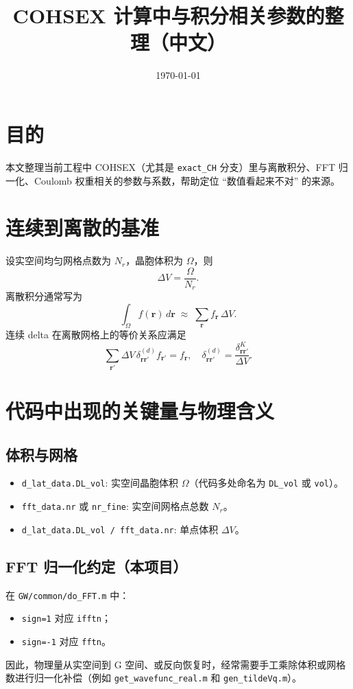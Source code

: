 \documentclass[11pt]{article}
\title{COHSEX 计算中与积分相关参数的整理（中文）}
\author{}
\date{\today}
\begin{document}
\maketitle

\section{目的}
本文整理当前工程中 COHSEX（尤其是 \texttt{exact\_CH} 分支）里与离散积分、FFT 归一化、Coulomb 权重相关的参数与系数，帮助定位 ``数值看起来不对'' 的来源。

\section{连续到离散的基准}
设实空间均匀网格点数为 $N_r$，晶胞体积为 $\Omega$，则
\[
\Delta V=\frac{\Omega}{N_r}.
\]
离散积分通常写为
\[
\int_{\Omega} f(\mathbf r)\, d\mathbf r
\;\approx\;
\sum_{\mathbf r} f_{\mathbf r}\,\Delta V.
\]
连续 delta 在离散网格上的等价关系应满足
\[
\sum_{\mathbf r'} \Delta V\,\delta^{(d)}_{\mathbf r\mathbf r'} f_{\mathbf r'}
=f_{\mathbf r},
\quad
\delta^{(d)}_{\mathbf r\mathbf r'}=\frac{\delta^K_{\mathbf r\mathbf r'}}{\Delta V}.
\]

\section{代码中出现的关键量与物理含义}
\subsection{体积与网格}
\begin{itemize}
  \item \texttt{d\_lat\_data.DL\_vol}: 实空间晶胞体积 $\Omega$（代码多处命名为 \texttt{DL\_vol} 或 \texttt{vol}）。
  \item \texttt{fft\_data.nr} 或 \texttt{nr\_fine}: 实空间网格点总数 $N_r$。
  \item \texttt{d\_lat\_data.DL\_vol / fft\_data.nr}: 单点体积 $\Delta V$。
\end{itemize}

\subsection{FFT 归一化约定（本项目）}
在 \texttt{GW/common/do\_FFT.m} 中：
\begin{itemize}
  \item \texttt{sign=1} 对应 \texttt{ifftn}；
  \item \texttt{sign=-1} 对应 \texttt{fftn}。
\end{itemize}
因此，物理量从实空间到 G 空间、或反向恢复时，经常需要手工乘除体积或网格数进行归一化补偿（例如 \texttt{get\_wavefunc\_real.m} 和 \texttt{gen\_tildeVq.m}）。
\end{document}

